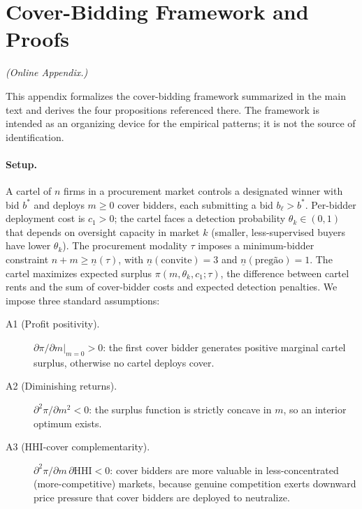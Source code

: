 
\section{Cover-Bidding Framework and Proofs}\label{app:proofs}
\noindent\textit{(Online Appendix.)}\medskip

This appendix formalizes the cover-bidding framework summarized
in the main text and derives the four propositions referenced
there. The framework is intended as an organizing device for
the empirical patterns; it is not the source of identification.

\label{prop:optimal_m}
\label{prop:regime1}
\label{prop:regime2}
\label{prop:market_selection}
\label{eq:cover_above}
\label{eq:cross_deriv}

\paragraph{Setup.}
A cartel of $n$ firms in a procurement market controls a
designated winner with bid $b^*$ and deploys $m \geq 0$ cover
bidders, each submitting a bid $b_\ell > b^*$. Per-bidder
deployment cost is $c_1 > 0$; the cartel faces a detection
probability $\theta_k \in (0,1)$ that depends on oversight
capacity in market $k$ (smaller, less-supervised buyers have
lower $\theta_k$). The procurement modality $\tau$ imposes a
minimum-bidder constraint $n + m \geq \underline{n}(\tau)$,
with $\underline{n}(\text{convite}) = 3$ and
$\underline{n}(\text{preg\~ao}) = 1$. The cartel maximizes
expected surplus $\pi(m, \theta_k, c_1; \tau)$, the difference
between cartel rents and the sum of cover-bidder costs and
expected detection penalties. We impose three standard
assumptions:

\begin{description}
\item[A1 (Profit positivity).] $\partial \pi / \partial m \big|_{m=0} > 0$:
the first cover bidder generates positive marginal cartel
surplus, otherwise no cartel deploys cover.
\item[A2 (Diminishing returns).] $\partial^2 \pi / \partial m^2 < 0$:
the surplus function is strictly concave in $m$, so an interior
optimum exists.
\item[A3 (HHI-cover complementarity).] $\partial^2 \pi /
\partial m \, \partial \mathrm{HHI} < 0$: cover bidders are
more valuable in less-concentrated (more-competitive) markets,
because genuine competition exerts downward price pressure that
cover bidders are deployed to neutralize.
\end{description}

